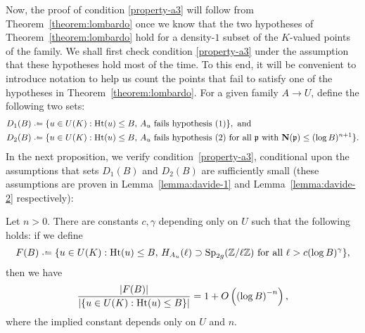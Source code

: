 Now, the proof of condition \ref{property-a3} will follow from Theorem~\ref{theorem:lombardo} once we know that the two hypotheses of Theorem~\ref{theorem:lombardo} hold for a density-$1$ subset of the $K$-valued points of the family. We shall first check condition \ref{property-a3} under the assumption that these hypotheses hold most of the time.
To this end, it will be convenient to introduce notation to help us count the points that fail to satisfy one of the hypotheses in Theorem~\ref{theorem:lombardo}. For a given family $A \to U$, define the following two sets:
\begin{align*}
D_1(B) & \defeq \{u \in U(K) : \on{Ht}(u) \le B,\,\text{$A_u$ fails hypothesis (1)}\}, \text{ and} \\
D_2(B) & \defeq \{u \in U(K) : \on{Ht}(u) \le B,\, \text{$A_u$ fails hypothesis (2) for all $\mf{p}$ with $\N(\mf{p}) \le (\log B)^{n+1}$}\}.
\end{align*}
In the next proposition, we verify condition~\ref{property-a3}, conditional upon the assumptions that sets $D_1(B)$ and $D_2(B)$ are sufficiently small (these assumptions are proven in Lemma~\ref{lemma:davide-1} and Lemma~\ref{lemma:davide-2} respectively):
\begin{proposition} \label{proposition:check-C}
Let $n>0$. There are constants $c, \gamma$ depending only on $U$ such that the following holds: if we define
		\[
		F(B) \defeq \{u \in U(K) : \on{Ht}(u) \le B,\, \mono_{A_u}(\ell) \supset \Sp_{2g}(\bz / \ell \ZZ) \text{ for all } \ell > c(\log B)^\gamma\},
		\]
		then we have
		\begin{equation} \label{yousayyourefineIknowyoubetterthanthat}
			\frac{|F(B)|}{|\{u \in U(K) : \operatorname{Ht}(u) \le B\}|} = 1 + O\left(\left( \log B \right)^{-n}\right),
		\end{equation}
        where the implied constant depends only on $U$ and $n$.
	\end{proposition}
